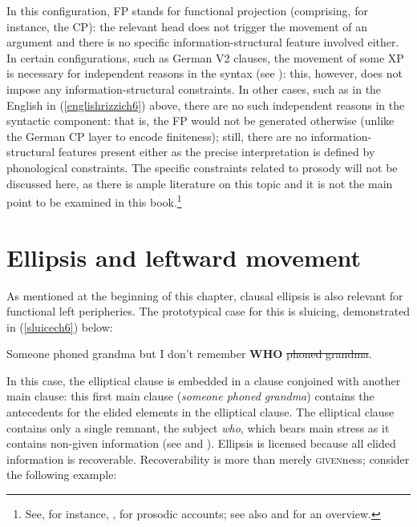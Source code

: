 In this configuration, FP stands for functional projection (comprising, for instance, the CP): the relevant head does not trigger the movement of an argument and there is no specific information-structural feature involved either. In certain configurations, such as German V2 clauses, the movement of some XP is necessary for independent reasons in the syntax (see ): this, however, does not impose any information-structural constraints. In other cases, such as in the English in (\ref{englishrizzich6}) above, there are no such independent reasons in the syntactic component: that is, the FP would not be generated otherwise (unlike the German CP layer to encode finiteness); still, there are no information-structural features present either as the precise interpretation is defined by phonological constraints. The specific constraints related to prosody will not be discussed here, as there is ample literature on this topic and it is not the main point to be examined in this book.\footnote{See, for instance, \citet{ferydrenhaus2008}, \citet{fanselowlenertova2011} \citet{wierzba2017diss} for prosodic accounts; see also \citet{fanselow2016} and \citet{wierzbafanselow2020} for an overview.}

\section{Ellipsis and leftward movement} \label{sec:6ellipsis}
As mentioned at the beginning of this chapter, clausal ellipsis is also relevant for functional left peripheries. The prototypical case for this is sluicing, demonstrated in (\ref{sluicech6}) below:

\ea Someone phoned grandma but I don't remember \textbf{WHO} \sout{phoned grandma}. \label{sluicech6}
\z

In this case, the elliptical clause is embedded in a clause conjoined with another main clause: this first main clause (\textit{someone phoned grandma}) contains the antecedents for the elided elements in the elliptical clause. The elliptical clause contains only a single remnant, the subject \textit{who}, which bears main stress as it contains non-given information (see  and ). Ellipsis is licensed because all elided information is recoverable. Recoverability is more than merely \textsc{given}ness; consider the following example:

\z

